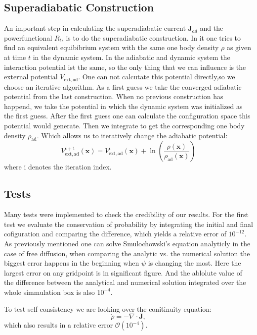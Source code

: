 \documentclass[a4paper]{article}
\renewcommand\vec[1]{\mathbf{#1}}
\begin{document}
\subsection{Superadiabatic Construction}
An important step in calculating the superadiabatic current $\vec{J}_{ad}$ and the powerfunctional $R_t$, is to do the superadiabatic construction. In it one tries to find an equivalent equibibrium system with the same one body density $\rho$ as given at time $t$ in the dynamic system. In the adiabatic and dynamic system the interaction potential ist the same, so the only thing that we can influence is the external potential $V_{\mathrm{ext,ad}}$. One can not calcutate this potential directly,so we choose an iterative algorithm. As a first guess we take the converged adiabatic potential from the last construction. When no previous construction has happend, we take the potential in which the dynamic system was initialized as the first guess.
After the first guess one can calculate the configuration space this potential would generate. Then we integrate to get the corresponding one body density $\rho_\mathrm{ad} $. Which allows us to iteratively change the adiabatic potential:
\begin{equation}
V_{\mathrm{ext,ad}}^{i+1}(\vec{x})=V_{\mathrm{ext,ad}}^{i}(\vec{x}) + \ln\left( \frac{\rho(\vec{x})}{\rho_{\mathrm{ad}}(\vec{x})} \right) 
\end{equation}
where i denotes the iteration index.
\subsection{Tests}
Many tests were implemented to check the credibility of our results. For the first test we evaluate the conservation of probability by integrating the initial and final cofiguration and comparing the difference, which yields a relative error of $10^{-12}$.
As previously mentioned one can solve Smulochowski's equation analyticly in the case of free diffusion, when comparing the analytic vs. the numerical solution the biggest error happens in the beginning when $\psi$ is changing the most. Here the largest error on any gridpoint is in  significant figure. And  the ablolute value of the difference between the analytical and numerical solution integrated over the whole simmulation box is also $10^{-4}$.  

To test self consistency we are looking over the conitinuity equation:
\begin{equation}
	\dot{\rho}=- \nabla \cdot \vec{J},
	\label{eq:coninuity}
\end{equation}
which also results in a relative error $\mathcal{O} (10^{-4})$.  
\end{document}
